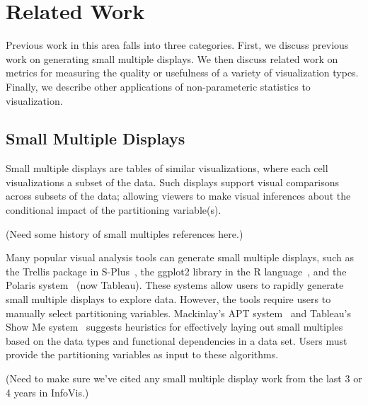 \section{Related Work}
\label{sec:related}
Previous work in this area falls into three categories. First, we discuss previous work on generating small multiple displays. We then discuss related work on metrics for measuring the quality or usefulness of a variety of visualization types. Finally, we describe other applications of non-parameteric statistics to visualization.

\subsection{Small Multiple Displays}
Small multiple displays are tables of similar visualizations, where each cell visualizations a subset of the data. Such displays support visual comparisons across subsets of the data; allowing viewers to make visual inferences about the conditional impact of the partitioning variable(s).

(Need some history of small multiples references here.)

Many popular visual analysis tools can generate small multiple displays, such as the Trellis package in S-Plus~\cite{Becker1996-manual}, the ggplot2 library in the R language~\cite{Wickham2006}, and the Polaris system~\cite{Stolte2002} (now Tableau). These systems allow users to rapidly generate small multiple displays to explore data. However, the tools require users to manually select partitioning variables. Mackinlay's APT system~\cite{mackinlay1986} and Tableau's Show Me system~\cite{mackinlay2007} suggests heuristics for effectively laying out small multiples based on the data types and functional dependencies in a data set. Users must provide the partitioning variables as input to these algorithms. 


(Need to make sure we've cited any small multiple display work from the last 3 or 4 years in InfoVis.)


